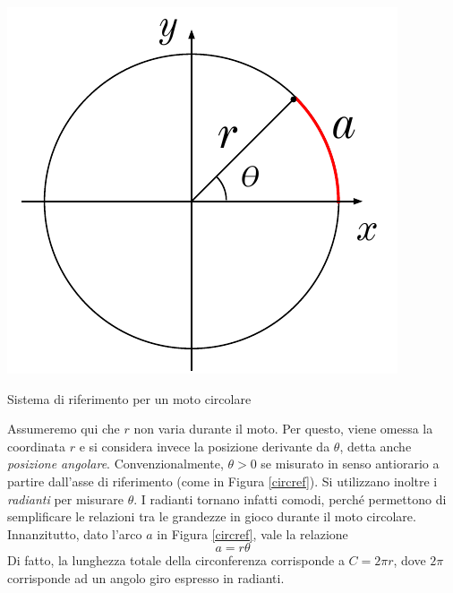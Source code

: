\begin{marginfigure}
    \centering
    \includegraphics[width = \marginparwidth]{figures/riferimentocirc.pdf}
    \caption{Sistema di riferimento per un moto circolare}
    \label{circref}
\end{marginfigure}

Assumeremo qui che $r$ non varia durante il moto. Per questo, viene omessa
la coordinata $r$ e si considera invece la posizione derivante da $\theta$,
detta anche \textit{posizione angolare}. Convenzionalmente, $\theta > 0$ se
misurato in senso antiorario a partire dall'asse di riferimento (come in
Figura \ref{circref}). Si utilizzano inoltre i \textit{radianti} per misurare
$\theta$. I radianti tornano infatti comodi, perché permettono di semplificare
le relazioni tra le grandezze in gioco durante il moto circolare. Innanzitutto,
dato l'arco $a$ in Figura \ref{circref}, vale la relazione \[ a = r\theta \]
Di fatto, la lunghezza totale della circonferenza corrisponde a $C = 2\pi r$,
dove $2\pi$ corrisponde ad un angolo giro espresso in radianti.

